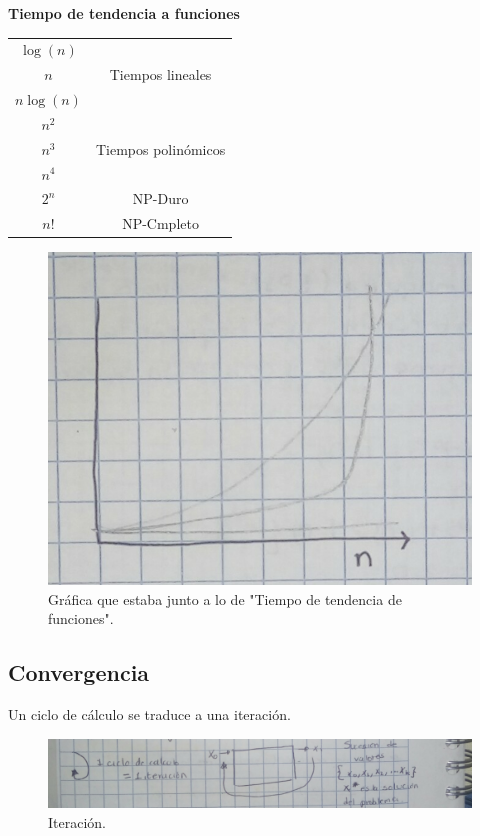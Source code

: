 \begin{center}
\textbf{Tiempo de tendencia a funciones}\\
\begin{tabular}{| c | c |}
\hline
$\log(n)$ & \\
$n$ & Tiempos lineales \\ 
$n\log(n)$ & \\
\hline
$n^2$ & \\
$n^3$ & Tiempos polin\'omicos \\ 
$n^4$ & \\
\hline
$2^n$ & NP-Duro \\
$n!$ & NP-Cmpleto\\
\hline
\end{tabular}
\end{center}
\begin{figure}[h]
\includegraphics[scale=.16]{grafica-log}
\centering
\caption{Gr\'afica que estaba junto a lo de "Tiempo de tendencia de funciones".}
\end{figure}

\subsection{Convergencia} 
Un ciclo de c\'alculo se traduce a una iteraci\'on. \\

\begin{figure}[h]
\includegraphics[scale=.16]{iteracion}
\centering
\caption{Iteraci\'on.}
\end{figure}

